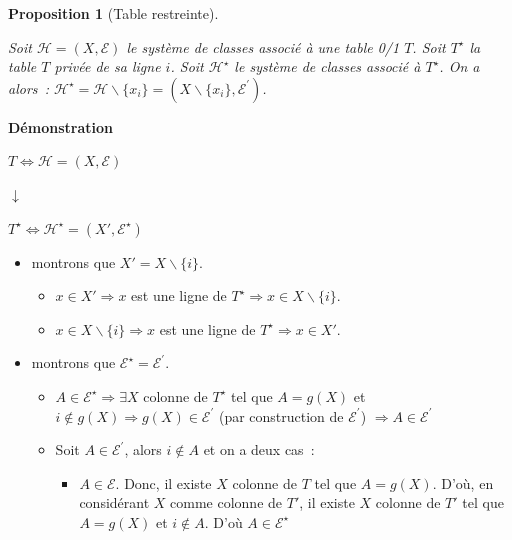 \documentclass[a4paper]{report}
\renewcommand{\textbf}[1]{\begingroup\bfseries\mathversion{bold}#1\endgroup}
\newtheorem{proposition}{Proposition}[chapter]
\newenvironment{preuve}{\textbf{Démonstration}}{}
\begin{document}
\label{sens1}

\begin{proposition}[Table restreinte]
\label{tablerestreinte}

Soit $\mathcal{H} = (X, \mathcal{E})$ le système de classes associé à une table 0/1 $T$.
Soit $T^{\star}$ la table $T$ privée de sa ligne $i$.
Soit $\mathcal{H}^{\star}$ le système de classes associé à $T^{\star}$.
On a alors~: 
$\mathcal{H}^{\star} = \mathcal{H} \backslash \{x_i\}  =(X \backslash \{x_i\} , \mathcal{E}^{'})$.

\end{proposition}

\begin{preuve}

\begin{center}
$T \Longleftrightarrow  \mathcal{H} = (X  , \mathcal{E})$

$\downarrow$ 

$T^{\star}  \Longleftrightarrow \mathcal{H}^{\star} = (X' , \mathcal{E}^{\star})$
\end{center}

\begin{itemize}
 \item montrons que $X' = X \backslash \{i\}$.
    \begin{itemize}
    \item 
$x \in X'
\Rightarrow
x$ est une ligne de $T^{\star}
\Rightarrow
x \in X \backslash \{i\}
$. 
    \item 
$x \in X \backslash \{i\}
\Rightarrow
x$ est une ligne de $T^{\star}
\Rightarrow
x \in X'
$. 
    \end{itemize}

 \item montrons que $\mathcal{E}^{\star} = \mathcal{E}^{'}$.
    \begin{itemize}
    \item
$A \in \mathcal{E}^{\star}
\Rightarrow
\exists X$ colonne de $T^{\star}$ tel que $A = g(X)$ et $i \notin g(X)
\Rightarrow
g(X) \in \mathcal{E}^{'}$ (par construction de $\mathcal{E}^{'}$)
$\Rightarrow
A \in \mathcal{E}^{'}
$
    \item 
Soit $A \in \mathcal{E}^{'}$, alors $i \notin A$ et on a deux cas~:
          \begin{itemize}
          \item $A \in \mathcal{E}$.
          Donc, il existe $X$ colonne de $T$ tel que $A = g(X)$.
          D'où, en considérant $X$ comme colonne de $T'$, il existe $X$ colonne de $T'$ tel que $A = g(X)$ et $i \notin A$.
          D'où $A \in \mathcal{E}^{\star}$


\end{itemize}
\end{itemize}
\end{itemize}
\end{preuve}
\end{document}
